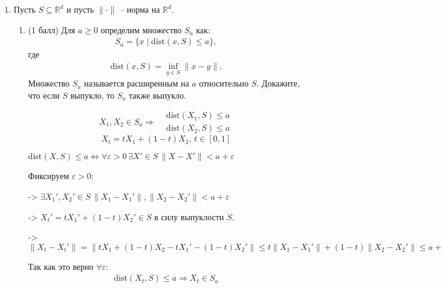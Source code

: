\documentclass[a5paper,twoside,russian]{article}
\begin{document}
\begin{enumerate}[label=\textbf{Задача \arabic*.}]
\begin{enumerate}
\begin{prf}
        \end{prf}
    
    \end{enumerate}
    
    \item Пусть $ S \subseteq \mathbb{R}^d$ и пусть $\|\cdot\|$ -- норма на $\mathbb{R}^d$.
    \begin{enumerate}
        \item (1 балл) Для $a \geq 0$ определим множество $S_a$ как:
        \begin{align*}
            S_a = \{x \mid \text{dist}(x, S) \leq a \},
        \end{align*}
        где 
        \begin{align*}
            \text{dist}(x, S) = \inf_{y \in S} \| x - y \|.
        \end{align*}
        Множество $S_a$ называется расширенным на $a$ относительно $S$. Докажите, что если $S$ выпукло, то $S_a$ также выпукло.

        \begin{prf}
            \[
            X_1, X_2 \in S_a \Rightarrow
            \begin{aligned}
                & \text{dist}(X_1, S) \leq a \\
                & \text{dist}(X_2, S) \leq a
            \end{aligned}
            \]
            \[
            X_t = tX_1 + (1-t)X_2, \, t \in [0, 1]
            \]

            $\text{dist}(X, S) \leq a \Leftrightarrow \forall \varepsilon > 0 \, \exists X' \in S \, \| X- X' \| < a + \varepsilon$
            
            \vspace{5pt} 
            Фиксируем $\varepsilon > 0$:

            -> $\exists X_1', X_2' \in S \, \| X_1 - X_1' \|, \| X_2 - X_2' \| < a + \varepsilon$
            
            -> $X_t' = tX_1' + (1-t)X_2' \in S$ в силу выпуклости $S$.

            -> $\| X_t - X_t' \| = \| tX_1 + (1-t)X_2 - tX_1' - (1-t)X_2' \| \leq t \| X_1 - X_1' \| + (1-t) \| X_2 - X_2' \| \leq a + \varepsilon$
            
            \vspace{5pt} 
            Так как это верно $\forall \varepsilon$:
            \[
            \begin{aligned}
                \text{dist} (X_t, S) \leq a \Rightarrow X_t \in S_a
            \end{aligned}
            \]        
        \end{prf}


\end{enumerate}
\end{enumerate}
\end{document}
